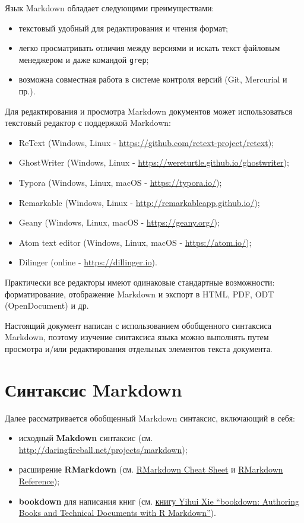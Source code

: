 \documentclass[
  a4paper,
]{book}
\providecommand{\tightlist}{%
  \setlength{\itemsep}{0pt}\setlength{\parskip}{0pt}}
\theoremstyle{definition}
\theoremstyle{definition}
\theoremstyle{definition}
\theoremstyle{definition}
\theoremstyle{remark}
\begin{document}
Язык Markdown обладает следующими преимуществами:

\begin{itemize}
\tightlist
\item
  текстовый удобный для редактирования и чтения формат;
\item
  легко просматривать отличия между версиями и искать текст файловым менеджером и даже командой \texttt{grep};
\item
  возможна совместная работа в системе контроля версий (Git, Mercurial и пр.).
\end{itemize}

Для редактирования и просмотра Markdown документов может использоваться текстовый редактор с поддержкой Markdown:

\begin{itemize}
\tightlist
\item
  ReText (Windows, Linux - \url{https://github.com/retext-project/retext});
\item
  GhostWriter (Windows, Linux - \url{https://wereturtle.github.io/ghostwriter});
\item
  Typora (Windows, Linux, macOS - \url{https://typora.io/});
\item
  Remarkable (Windows, Linux - \url{http://remarkableapp.github.io/});
\item
  Geany (Windows, Linux, macOS - \url{https://geany.org/});
\item
  Atom text editor (Windows, Linux, macOS - \url{https://atom.io/});
\item
  Dilinger (online - \url{https://dillinger.io}).
\end{itemize}

Практически все редакторы имеют одинаковые стандартные возможности: форматирование, отображение Markdown и экспорт в HTML, PDF, ODT (OpenDocument) и др.

Настоящий документ написан с использованием обобщенного синтаксиса Markdown, поэтому изучение синтаксиса языка можно выполнять путем просмотра и/или редактирования отдельных элементов текста документа.

\section{Синтаксис Markdown}\label{markdown-syntax}

Далее рассматривается обобщенный Markdown синтаксис, включающий в себя:

\begin{itemize}
\tightlist
\item
  исходный \textbf{Makdown} синтаксис (см. \url{http://daringfireball.net/projects/markdown});
\item
  расширение \textbf{RMarkdown} (см. \href{https://raw.githubusercontent.com/rstudio/cheatsheets/master/rmarkdown-2.0.pdf}{RMarkdown Cheat Sheet} и \href{https://www.rstudio.com/wp-content/uploads/2015/03/rmarkdown-reference.pdf}{RMarkdown Reference});
\item
  \textbf{bookdown} для написания книг (см. \href{https://bookdown.org/yihui/bookdown/}{книгу Yihui Xie ``bookdown: Authoring Books and Technical Documents with R Markdown''}).
\end{itemize}
\end{document}
